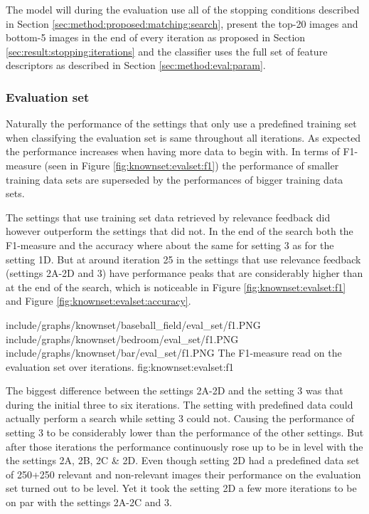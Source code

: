 The model will during the evaluation use all of the stopping conditions described in Section \ref{sec:method:proposed:matching:search}, present the top-20 images and bottom-5 images in the end of every iteration as proposed in Section \ref{sec:result:stopping:iterations} and the classifier uses the full set of feature descriptors as described in Section \ref{sec:method:eval:param}. 

\subsubsection{Evaluation set}
\label{sec:res:knownset:eval}
Naturally the performance of the settings that only use a predefined training set when classifying the evaluation set is same throughout all iterations. As expected the performance increases when having more data to begin with. In terms of F1-measure (seen in Figure \ref{fig:knownset:evalset:f1}) the performance of smaller training data sets are superseded by the performances of bigger training data sets. 


The settings that use training set data retrieved by relevance feedback did however outperform the settings that did not. In the end of the search both the F1-measure and the accuracy where about the same for setting 3 as for the setting 1D. But at around iteration 25 in the settings that use relevance feedback (settings 2A-2D and 3) have performance peaks that are considerably higher than at the end of the search, which is noticeable in Figure \ref{fig:knownset:evalset:f1} and Figure \ref{fig:knownset:evalset:accuracy}.

\tripfigurenear
{include/graphs/knownset/baseball_field/eval_set/f1.PNG}
{include/graphs/knownset/bedroom/eval_set/f1.PNG}
{include/graphs/knownset/bar/eval_set/f1.PNG}
{The F1-measure read on the evaluation set over iterations.}
{fig:knownset:evalset:f1}

The biggest difference between the settings 2A-2D and the setting 3 was that during the initial three to six iterations. The setting with predefined data could actually perform a search while setting 3 could not. Causing the performance of setting 3 to be considerably lower than the performance of the other settings. But after those iterations the performance continuously rose up to be in level with the the settings 2A, 2B, 2C \& 2D. Even though setting 2D had a predefined data set of 250+250 relevant and non-relevant images their performance on the evaluation set turned out to be level. Yet it took the setting 2D a few more iterations to be on par with the settings 2A-2C and 3.

